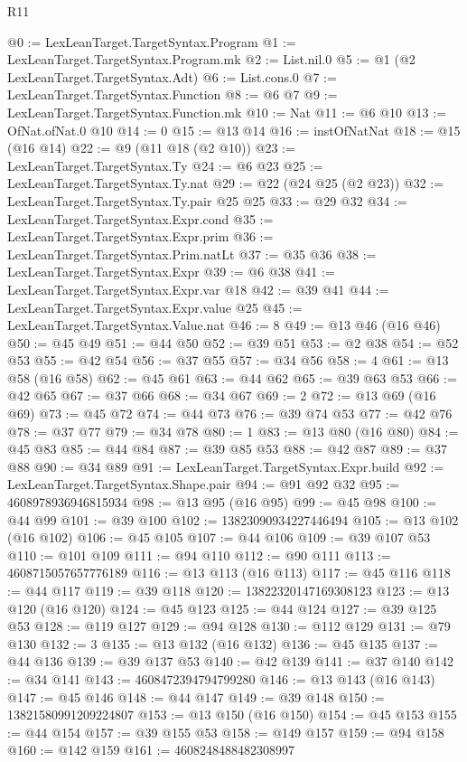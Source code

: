\begin{lexlean}{R11}
\begin{coremodule}
@0 := LexLeanTarget.TargetSyntax.Program
@1 := LexLeanTarget.TargetSyntax.Program.mk
@2 := List.nil.{0}
@5 := @1 (@2 LexLeanTarget.TargetSyntax.Adt)
@6 := List.cons.{0}
@7 := LexLeanTarget.TargetSyntax.Function
@8 := @6 @7
@9 := LexLeanTarget.TargetSyntax.Function.mk
@10 := Nat
@11 := @6 @10
@13 := OfNat.ofNat.{0} @10
@14 := 0
@15 := @13 @14
@16 := instOfNatNat
@18 := @15 (@16 @14)
@22 := @9 (@11 @18 (@2 @10))
@23 := LexLeanTarget.TargetSyntax.Ty
@24 := @6 @23
@25 := LexLeanTarget.TargetSyntax.Ty.nat
@29 := @22 (@24 @25 (@2 @23))
@32 := LexLeanTarget.TargetSyntax.Ty.pair @25 @25
@33 := @29 @32
@34 := LexLeanTarget.TargetSyntax.Expr.cond
@35 := LexLeanTarget.TargetSyntax.Expr.prim
@36 := LexLeanTarget.TargetSyntax.Prim.natLt
@37 := @35 @36
@38 := LexLeanTarget.TargetSyntax.Expr
@39 := @6 @38
@41 := LexLeanTarget.TargetSyntax.Expr.var @18
@42 := @39 @41
@44 := LexLeanTarget.TargetSyntax.Expr.value @25
@45 := LexLeanTarget.TargetSyntax.Value.nat
@46 := 8
@49 := @13 @46 (@16 @46)
@50 := @45 @49
@51 := @44 @50
@52 := @39 @51
@53 := @2 @38
@54 := @52 @53
@55 := @42 @54
@56 := @37 @55
@57 := @34 @56
@58 := 4
@61 := @13 @58 (@16 @58)
@62 := @45 @61
@63 := @44 @62
@65 := @39 @63 @53
@66 := @42 @65
@67 := @37 @66
@68 := @34 @67
@69 := 2
@72 := @13 @69 (@16 @69)
@73 := @45 @72
@74 := @44 @73
@76 := @39 @74 @53
@77 := @42 @76
@78 := @37 @77
@79 := @34 @78
@80 := 1
@83 := @13 @80 (@16 @80)
@84 := @45 @83
@85 := @44 @84
@87 := @39 @85 @53
@88 := @42 @87
@89 := @37 @88
@90 := @34 @89
@91 := LexLeanTarget.TargetSyntax.Expr.build
@92 := LexLeanTarget.TargetSyntax.Shape.pair
@94 := @91 @92 @32
@95 := 4608978936946815934
@98 := @13 @95 (@16 @95)
@99 := @45 @98
@100 := @44 @99
@101 := @39 @100
@102 := 13823090934227446494
@105 := @13 @102 (@16 @102)
@106 := @45 @105
@107 := @44 @106
@109 := @39 @107 @53
@110 := @101 @109
@111 := @94 @110
@112 := @90 @111
@113 := 4608715057657776189
@116 := @13 @113 (@16 @113)
@117 := @45 @116
@118 := @44 @117
@119 := @39 @118
@120 := 13822320147169308123
@123 := @13 @120 (@16 @120)
@124 := @45 @123
@125 := @44 @124
@127 := @39 @125 @53
@128 := @119 @127
@129 := @94 @128
@130 := @112 @129
@131 := @79 @130
@132 := 3
@135 := @13 @132 (@16 @132)
@136 := @45 @135
@137 := @44 @136
@139 := @39 @137 @53
@140 := @42 @139
@141 := @37 @140
@142 := @34 @141
@143 := 4608472394794799280
@146 := @13 @143 (@16 @143)
@147 := @45 @146
@148 := @44 @147
@149 := @39 @148
@150 := 13821580991209224807
@153 := @13 @150 (@16 @150)
@154 := @45 @153
@155 := @44 @154
@157 := @39 @155 @53
@158 := @149 @157
@159 := @94 @158
@160 := @142 @159
@161 := 4608248488482308997

\end{coremodule}
\end{lexlean}
